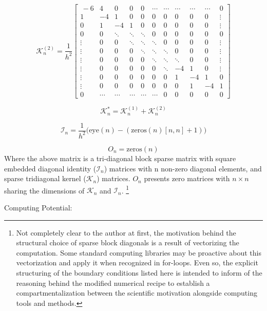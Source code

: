 \[
    \mathcal{K}_n^{(2)}  = 
\frac{1}{h^2}
\begin{bmatrix} \,
-6 & 4 & 0 & 0& 0 & \cdots & \cdots & \cdots & \cdots & \cdots & 0 \\
1 & -4 & 1 & 0 & 0 & 0 & 0 & 0 & 0 & 0 & \vdots \\
0 & 1 & -4 & 1 & 0 & 0 & 0 & 0 & 0 & 0 & \vdots \\
0 & 0 & \ddots & \ddots & \ddots & 0 & 0 & 0 & 0 & 0 & 0 \\
\vdots & 0  & 0  & \ddots & \ddots & \ddots & 0 & 0 & 0 & 0  & \vdots \\
\vdots & 0  & 0  & 0  & \ddots & \ddots & \ddots & 0 & 0 & 0 & \vdots \\
\vdots & 0  & 0  & 0 & 0 & \ddots & \ddots & \ddots & 0 & 0  & \vdots \\
\vdots & 0  & 0  & 0 & 0 & 0 & \ddots & -4 & 1 & 0  & \vdots\\
\vdots & 0  & 0  & 0 & 0 & 0 & 0 & 1 & -4  & 1 & 0\\
\vdots & 0 & 0 & 0 & 0 & 0 & 0 & 0 & 1 & -4 & 1\\
0      & \cdots & \cdots & \cdots & \cdots & \cdots & 0 & 0 & 0 & 0 & 0 
\end{bmatrix}
\]

\[
	\mathcal{K}_n^{*} = \mathcal{K}_n^{(1)} + \mathcal{K}_n^{(2)} 
\]

\[
    \mathcal{I}_n = \frac{1}{h^2} \bigg( \mathrm{eye}(n) - (\mathrm{zeros}(n)[n,n] + 1) \bigg)
\]

\[ 
	O_{n} = \mathrm{zeros}(n)
\]	
Where the above matrix is a tri-diagonal block sparse matrix with square embedded diagonal identity ($\mathcal{I}_n$) matrices with n non-zero diagonal elements, and sparse tridiagonal kernel ($\mathcal{K}_n$) matrices. $O_n$ presents zero matrices with $n\times n$ sharing the dimensions of $\mathcal{K}_n$ and $\mathcal{I}_n$. \footnote{Not completely clear to the author at first, the motivation behind the structural choice of sparse block diagonals is a result of vectorizing the computation. Some standard computing libraries may be proactive about this vectorization and apply it when recognized in for-loops. Even so, the explicit structuring of the boundary conditions listed here is intended to inform of the reasoning behind the modified numerical recipe to establish a compartmentalization between the scientific motivation alongside computing tools and methods.}

\newpage

\noindent Computing Potential:

